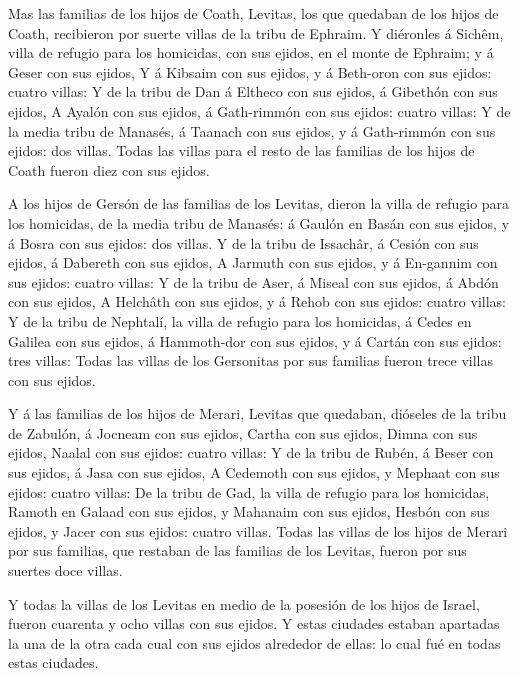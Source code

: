 Mas las familias de los hijos de Coath, Levitas, los que
quedaban de los hijos de Coath, recibieron por suerte villas de la tribu
de Ephraim.  Y diéronles á Sichêm, villa de refugio para
los homicidas, con sus ejidos, en el monte de Ephraim; y á Geser con sus
ejidos,  Y á Kibsaim con sus ejidos, y á Beth-oron con
sus ejidos: cuatro villas:  Y de la tribu de Dan á
Eltheco con sus ejidos, á Gibethón con sus ejidos,  A
Ayalón con sus ejidos, á Gath-rimmón con sus ejidos: cuatro villas:
 Y de la media tribu de Manasés, á Taanach con sus
ejidos, y á Gath-rimmón con sus ejidos: dos villas. 
Todas las villas para el resto de las familias de los hijos de Coath
fueron diez con sus ejidos.

 A los hijos de Gersón de las familias de los Levitas,
dieron la villa de refugio para los homicidas, de la media tribu de
Manasés: á Gaulón en Basán con sus ejidos, y á Bosra con sus ejidos: dos
villas.  Y de la tribu de Issachâr, á Cesión con sus
ejidos, á Dabereth con sus ejidos,  A Jarmuth con sus
ejidos, y á En-gannim con sus ejidos: cuatro villas:  Y
de la tribu de Aser, á Miseal con sus ejidos, á Abdón con sus ejidos,
 A Helchâth con sus ejidos, y á Rehob con sus ejidos:
cuatro villas:  Y de la tribu de Nephtalí, la villa de
refugio para los homicidas, á Cedes en Galilea con sus ejidos, á
Hammoth-dor con sus ejidos, y á Cartán con sus ejidos: tres villas:
 Todas las villas de los Gersonitas por sus familias
fueron trece villas con sus ejidos.

 Y á las familias de los hijos de Merari, Levitas que
quedaban, dióseles de la tribu de Zabulón, á Jocneam con sus ejidos,
Cartha con sus ejidos,  Dimna con sus ejidos, Naalal con
sus ejidos: cuatro villas:  Y de la tribu de Rubén, á
Beser con sus ejidos, á Jasa con sus ejidos,  A Cedemoth
con sus ejidos, y Mephaat con sus ejidos: cuatro villas: 
De la tribu de Gad, la villa de refugio para los homicidas, Ramoth en
Galaad con sus ejidos, y Mahanaim con sus ejidos,  Hesbón
con sus ejidos, y Jacer con sus ejidos: cuatro villas. 
Todas las villas de los hijos de Merari por sus familias, que restaban
de las familias de los Levitas, fueron por sus suertes doce villas.

 Y todas la villas de los Levitas en medio de la posesión
de los hijos de Israel, fueron cuarenta y ocho villas con sus ejidos.
 Y estas ciudades estaban apartadas la una de la otra
cada cual con sus ejidos alrededor de ellas: lo cual fué en todas estas
ciudades.

